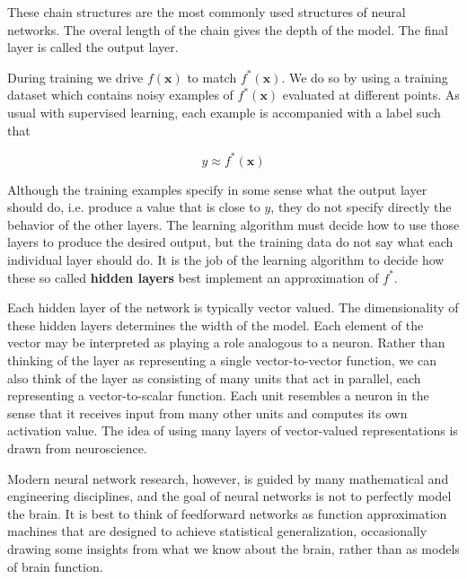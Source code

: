 These chain structures are the most commonly used structures of neural networks. The overal length of the chain gives
the depth of the model. The final layer is called the output layer. 

During training we drive $f(\mathbf{x})$ to match $f^{*}(\mathbf{x})$. We do so by using a training dataset which contains noisy examples of 
$f^{*}(\mathbf{x})$ evaluated at different points. As usual with supervised learning, each example is accompanied with a label such that

\begin{equation}
y \approx f^{*}(\mathbf{x}) 
\end{equation}

Although the training examples specify in some sense what the output layer should do, i.e. produce a value that is close to $y$, they do not
specify directly the behavior of the other layers. The learning algorithm must decide
how to use those layers to produce the desired output, but the training data do
not say what each individual layer should do. It is the job of the learning algorithm to decide how these so called \textbf{hidden layers} best implement
an approximation of $f^{*}$. 

Each hidden layer of the network is typically vector valued. The
dimensionality of these hidden layers determines the
width of the model. Each element of the vector may be interpreted as playing a role analogous to a neuron.
Rather than thinking of the layer as representing a single vector-to-vector function,
we can also think of the layer as consisting of many
units
that act in parallel,
each representing a vector-to-scalar function. Each unit resembles a neuron in
the sense that it receives input from many other units and computes its own
activation value. The idea of using many layers of vector-valued representations
is drawn from neuroscience.

\begin{framed}
\begin{remark}{}

Modern neural network research,
however, is guided by many mathematical and engineering disciplines, and the
goal of neural networks is not to perfectly model the brain. It is best to think of
feedforward networks as function approximation machines that are designed to
achieve statistical generalization, occasionally drawing some insights from what we
know about the brain, rather than as models of brain function.
\end{remark}
\end{framed}


